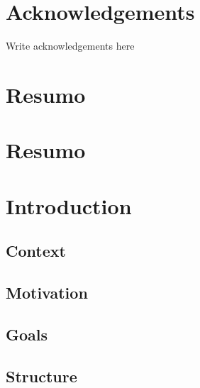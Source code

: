 \documentclass[
  oneside,
  11pt, a4paper,
  footinclude=true,
  headinclude=true,
  cleardoublepage=empty
]{scrbook}
\author{Aluno 1}
\date{\myear} %
\begin{document}
	\umfrontcover	
	\umtitlepage
	
	\chapter*{Acknowledgements}
	Write acknowledgements here


	
	\cleardoublepage
	\chapter*{Resumo}
	
	
	\cleardoublepage
	\chapter*{Resumo}
	
	
	
	\tableofcontents
	\listoffigures
	\listoftables
	\printglossary[type=\acronymtype]
	\clearpage
	\thispagestyle{empty}

	
	
	\chapter{Introduction}
	    
        \section{Context}
        
        \section{Motivation}
        
        \section{Goals}
        
        \section{Structure}
        
		
\end{document}
